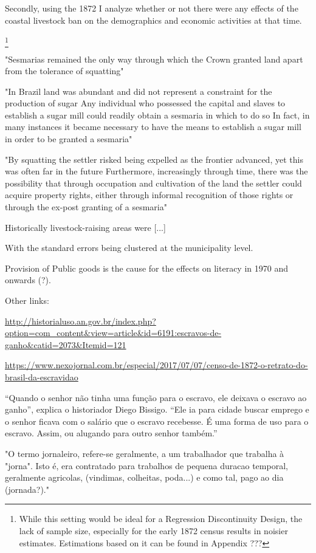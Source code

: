 \documentclass{article}
\begin{document}
Secondly, using the 1872 I analyze whether or not there were any effects of the coastal livestock ban on the demographics and economic activities at that time.

\footnote{While this setting would be ideal for a Regression Discontinuity Design, the lack of sample size, especially for the early 1872 census results in noisier estimates. Estimations based on it can be found in Appendix ???}

\textcite{Mueller1995-gi} 

"Sesmarias  remained the only way through  which the  Crown granted  land apart from the tolerance  of squatting" 

"In Brazil land was abundant  and did not represent a constraint  for the production  of sugar   Any individual who 
possessed the capital  and slaves to establish a sugar mill could readily obtain a sesmaria  in which to do so   In fact,  in   many instances  it became necessary to have the means to establish a sugar mill  in order to be granted a sesmaria"

"By squatting the settler risked being expelled as the frontier  advanced, yet this was often  far  in the future   Furthermore,  increasingly   through time, there was the possibility that through occupation and cultivation of the land the settler could acquire  property rights, either through  informal  recognition of those rights or through the ex-post granting of a  sesmaria"

Historically livestock-raising areas were [...]

With the standard errors being clustered at the municipality level. 


Provision of Public goods is the cause for the effects on literacy in 1970 and onwards (?).

Other links:

\url{http://historialuso.an.gov.br/index.php?option=com_content&view=article&id=6191:escravos-de-ganho&catid=2073&Itemid=121}

\url{https://www.nexojornal.com.br/especial/2017/07/07/censo-de-1872-o-retrato-do-brasil-da-escravidao}

“Quando o senhor não tinha uma função para o escravo, ele deixava o escravo ao ganho”, explica o historiador Diego Bissigo. “Ele ia para cidade buscar emprego e o senhor ficava com o salário que o escravo recebesse. É uma forma de uso para o escravo. Assim, ou alugando para outro senhor também.”

"O termo jornaleiro, refere-se geralmente, a um trabalhador que trabalha à "jorna". Isto é, era contratado para trabalhos de pequena duracao temporal, geralmente agricolas, (vindimas, colheitas, poda...) e como tal, pago ao dia (jornada?)."
\end{document}
